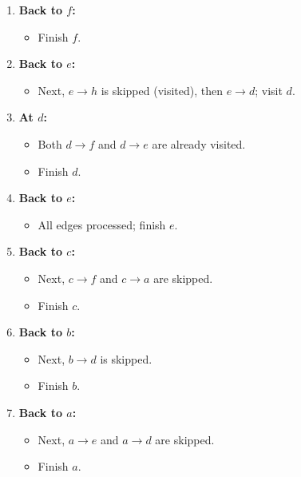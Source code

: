 \documentclass{article}
\begin{document}
\begin{enumerate}[label=\textbf{Step \arabic*:}]
    \item \textbf{Back to \(f\):}
    \begin{itemize}
        \item Finish \(f\).
    \end{itemize}
    
    \item \textbf{Back to \(e\):}
    \begin{itemize}
        \item Next, \(e \to h\) is skipped (visited), then \(e \to d\); visit \(d\).
    \end{itemize}
    
    \item \textbf{At \(d\):}
    \begin{itemize}
        \item Both \(d \to f\) and \(d \to e\) are already visited.
        \item Finish \(d\).
    \end{itemize}
    
    \item \textbf{Back to \(e\):}
    \begin{itemize}
        \item All edges processed; finish \(e\).
    \end{itemize}
    
    \item \textbf{Back to \(c\):}
    \begin{itemize}
        \item Next, \(c \to f\) and \(c \to a\) are skipped.
        \item Finish \(c\).
    \end{itemize}
    
    \item \textbf{Back to \(b\):}
    \begin{itemize}
        \item Next, \(b \to d\) is skipped.
        \item Finish \(b\).
    \end{itemize}
    
    \item \textbf{Back to \(a\):}
    \begin{itemize}
        \item Next, \(a \to e\) and \(a \to d\) are skipped.
        \item Finish \(a\).
    \end{itemize}
\end{enumerate}
\end{document}

